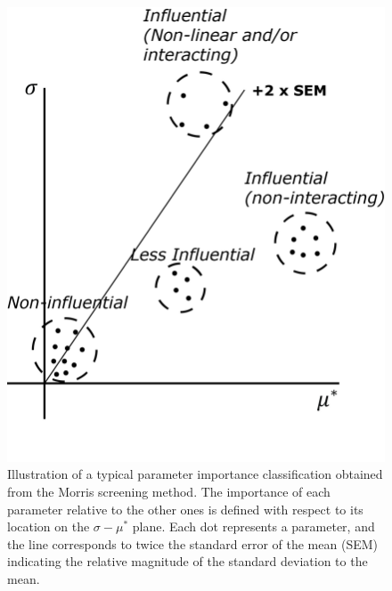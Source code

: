 \begin{figure}[bth]
	\centering
	\includegraphics[scale=0.90]{../figures/illustrateMorrisResult/illustrateMorrisResult.png}
	\caption[Illustration of a typical parameter importance classification based on Morris screening method]{Illustration of a typical parameter importance classification obtained from the Morris screening method. The importance of each parameter relative to the other ones is defined with respect to its location on the $\sigma - \mu^*$ plane. Each dot represents a parameter, and the line corresponds to twice the standard error of the mean (SEM) indicating the relative magnitude of the standard deviation to the mean.}\label{fig:illustration_morris_result}
\end{figure}
